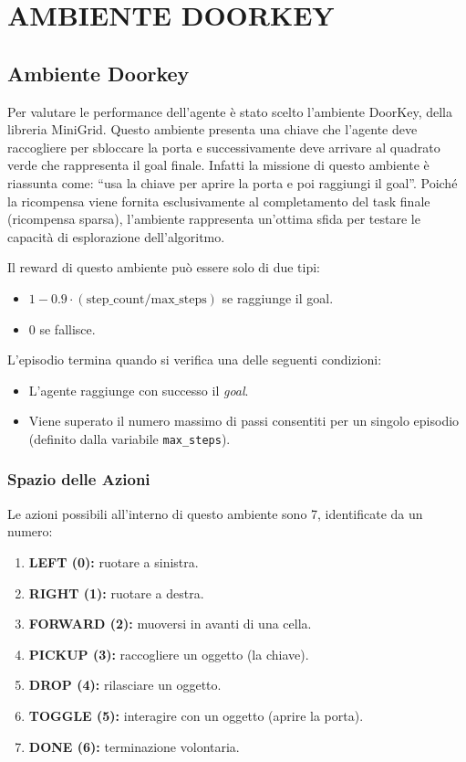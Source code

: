 \documentclass[12pt,a4paper]{article}
\begin{document}
\pagebreak

\section{AMBIENTE DOORKEY}

\subsection{Ambiente Doorkey}
Per valutare le performance dell’agente è stato scelto l’ambiente DoorKey, della libreria MiniGrid. Questo ambiente presenta una chiave che l’agente deve raccogliere per sbloccare la porta e successivamente deve arrivare al quadrato verde che rappresenta il goal finale. Infatti la missione di questo ambiente è riassunta come: “usa la chiave per aprire la porta e poi raggiungi il goal”. Poiché la ricompensa viene fornita esclusivamente al completamento del task finale (ricompensa sparsa), l’ambiente rappresenta un’ottima sfida per testare le capacità di esplorazione dell’algoritmo.

\noindent Il reward di questo ambiente può essere solo di due tipi:
\begin{itemize}
    \item $1 - 0.9 \cdot (\text{step\_count} / \text{max\_steps})$ se raggiunge il goal.
    \item 0 se fallisce.
\end{itemize}

L'episodio termina quando si verifica una delle seguenti condizioni:

\begin{itemize}
    \item L'agente raggiunge con successo il \textit{goal}.
    \item Viene superato il numero massimo di passi consentiti per un singolo episodio (definito dalla variabile \texttt{max\_steps}).
\end{itemize}

\subsubsection{Spazio delle Azioni}
Le azioni possibili all'interno di questo ambiente sono 7, identificate da un numero:

\begin{enumerate}
    \item \textbf{LEFT (0):} ruotare a sinistra.
    \item \textbf{RIGHT (1):} ruotare a destra.
    \item \textbf{FORWARD (2):} muoversi in avanti di una cella.
    \item \textbf{PICKUP (3):} raccogliere un oggetto (la chiave).
    \item \textbf{DROP (4):} rilasciare un oggetto.
    \item \textbf{TOGGLE (5):} interagire con un oggetto (aprire la porta).
    \item \textbf{DONE (6):} terminazione volontaria.
\end{enumerate}
\end{document}
